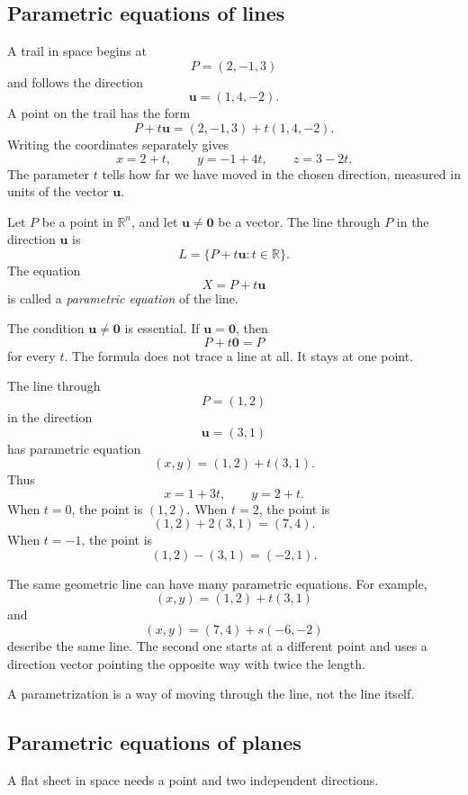 \subsection{Parametric equations of lines}

A trail in space begins at
\[
    P=(2,-1,3)
\]
and follows the direction
\[
    \mathbf u=(1,4,-2).
\]
A point on the trail has the form
\[
    P+t\mathbf u
    =
    (2,-1,3)+t(1,4,-2).
\]
Writing the coordinates separately gives
\[
    x=2+t,\qquad y=-1+4t,\qquad z=3-2t.
\]
The parameter \(t\) tells how far we have moved in the chosen direction, measured in
units of the vector \(\mathbf u\).

\begin{definition}
Let \(P\) be a point in \(\mathbb R^n\), and let \(\mathbf u\neq \mathbf 0\) be a vector.
The line through \(P\) in the direction \(\mathbf u\) is
\[
    L=\{P+t\mathbf u:t\in\mathbb R\}.
\]
The equation
\[
    X=P+t\mathbf u
\]
is called a \emph{parametric equation} of the line.
\end{definition}

The condition \(\mathbf u\neq \mathbf 0\) is essential.  If \(\mathbf u=\mathbf 0\), then
\[
    P+t\mathbf 0=P
\]
for every \(t\).  The formula does not trace a line at all.  It stays at one point.

\begin{example}
The line through
\[
    P=(1,2)
\]
in the direction
\[
    \mathbf u=(3,1)
\]
has parametric equation
\[
    (x,y)=(1,2)+t(3,1).
\]
Thus
\[
    x=1+3t,\qquad y=2+t.
\]
When \(t=0\), the point is \((1,2)\).  When \(t=2\), the point is
\[
    (1,2)+2(3,1)=(7,4).
\]
When \(t=-1\), the point is
\[
    (1,2)-(3,1)=(-2,1).
\]
\end{example}

The same geometric line can have many parametric equations.  For example,
\[
    (x,y)=(1,2)+t(3,1)
\]
and
\[
    (x,y)=(7,4)+s(-6,-2)
\]
describe the same line.  The second one starts at a different point and uses a direction
vector pointing the opposite way with twice the length.

A parametrization is a way of moving through the line, not the line itself.

\subsection{Parametric equations of planes}

A flat sheet in space needs a point and two independent directions.


